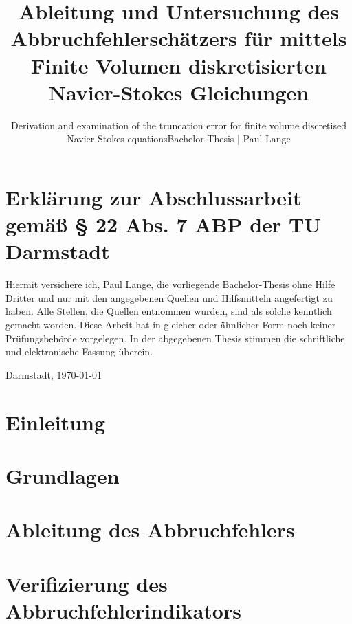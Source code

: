 \documentclass[colorback,longdoc,blackrule,bigchapter,accentcolor=tud2d,11pt]{tudreport}
\title{Ableitung und Untersuchung des Abbruchfehlerschätzers für mittels
Finite Volumen diskretisierten Navier-Stokes Gleichungen\linebreak[1]}
\subtitle{Derivation and examination of the truncation error for finite volume discretised Navier-Stokes equations\linebreak Bachelor-Thesis | Paul Lange}
\begin{document}
\maketitle

\cleardoublepage
\setcounter{page}{1}

\chapter*{Erklärung zur Abschlussarbeit gemäß § 22 Abs. 7 ABP der TU Darmstadt}
Hiermit versichere ich, Paul Lange, die vorliegende Bachelor-Thesis ohne
Hilfe Dritter und nur mit den angegebenen Quellen und Hilfsmitteln angefertigt
zu haben. Alle Stellen, die Quellen entnommen wurden, sind als solche kenntlich gemacht worden.
Diese Arbeit hat in gleicher oder ähnlicher Form noch keiner Prüfungsbehörde vorgelegen.
In der abgegebenen Thesis stimmen die schriftliche und elektronische Fassung überein.
\vspace{3cm}

Darmstadt, \today



\tableofcontents
\listoffigures

\cleardoublepage
{}
\setcounter{page}{1}

\chapter{Einleitung}

\cleardoublepage

\chapter{Grundlagen}






\cleardoublepage

\chapter{Ableitung des Abbruchfehlers}
\label{chap:herleitung}




\cleardoublepage

\chapter{Verifizierung des Abbruchfehlerindikators}



\end{document}

